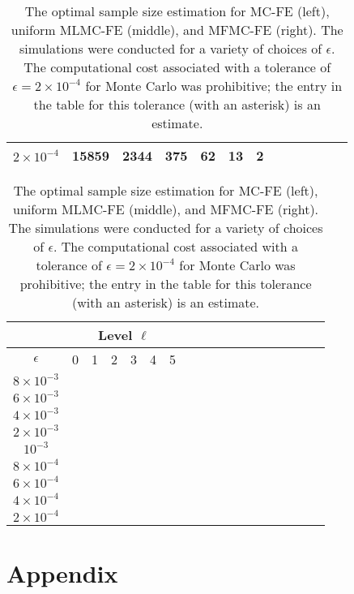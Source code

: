 \documentclass[final,3p,times,11pt]{elsarticle}
\begin{document}
\begin{table}[ht]
{\begin{tabular}{c|c|c|c|c|c|c|c|c|c|c|c|c|}
                \multicolumn{1}{|c|}{$2\times 10^{-4} $}&15859        &2344         &375          &62          &13           &2\\
			\hline
	\end{tabular}
 \qquad
		\begin{tabular}{c|c|c|c|c|c|c|c|c|c|c|c|c|c|c|c|c|c|}
	    \cline{2-7}	
		&\multicolumn{6}{|c|}{ Level $\ell$}\\
			\hline
			\multicolumn{1}{|c|}{$\epsilon$}&0&1&2&3&4&5\\
			\hline
			\multicolumn{1}{|c|}{$8\times 10^{-3} $}&&&&&&\\
			\multicolumn{1}{|c|}{$6\times 10^{-3} $}&&&&&&\\
			\multicolumn{1}{|c|}{$4\times 10^{-3} $}&&&&&&\\
			\multicolumn{1}{|c|}{$2\times 10^{-3} $}&&&&&&\\
			\multicolumn{1}{|c|}{$10^{-3} $}&&&&&&\\
			\multicolumn{1}{|c|}{$8\times 10^{-4} $}&&&&&&\\
                \multicolumn{1}{|c|}{$6\times 10^{-4} $}&&&&&&\\
			\multicolumn{1}{|c|}{$4\times 10^{-4} $}&&&&&&\\
                \multicolumn{1}{|c|}{$2\times 10^{-4} $}&&&&&&\\
			\hline
	\end{tabular}
 
 }
	\caption{The optimal sample size estimation for MC-FE (left), uniform MLMC-FE (middle), and MFMC-FE (right). The simulations were conducted for a variety of choices of $\epsilon$. The computational cost associated with a tolerance of $\epsilon = 2\times 10^{-4}$ for Monte Carlo was prohibitive; the entry in the table for this tolerance (with an asterisk) is an estimate.}
	\label{Tab:SampleSize}
\end{table}

\section{Appendix}\label{sec:Appendix}





\end{document}
